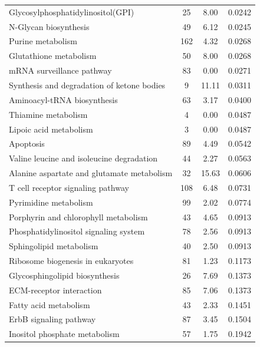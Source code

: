 \begin{table}[htbp]
\begin{tabular}{lccc}
    Glycosylphosphatidylinositol(GPI) & 25    & 8.00  & 0.0242 \\
    N-Glycan biosynthesis & 49    & 6.12  & 0.0245 \\
    Purine metabolism & 162   & 4.32  & 0.0268 \\
    Glutathione metabolism & 50    & 8.00  & 0.0268 \\
    mRNA surveillance pathway & 83    & 0.00  & 0.0271 \\
    Synthesis and degradation of ketone bodies & 9     & 11.11 & 0.0311 \\
    Aminoacyl-tRNA biosynthesis & 63    & 3.17  & 0.0400 \\
    Thiamine metabolism & 4     & 0.00  & 0.0487 \\
    Lipoic acid metabolism & 3     & 0.00  & 0.0487 \\
    \midrule
    Apoptosis & 89    & 4.49  & 0.0542 \\
    Valine  leucine and isoleucine degradation & 44    & 2.27  & 0.0563 \\
    Alanine  aspartate and glutamate metabolism & 32    & 15.63 & 0.0606 \\
    T cell receptor signaling pathway & 108   & 6.48  & 0.0731 \\
     Pyrimidine metabolism & 99    & 2.02  & 0.0774 \\
     Porphyrin and chlorophyll metabolism & 43    & 4.65  & 0.0913 \\
    Phosphatidylinositol signaling system & 78    & 2.56  & 0.0913 \\
     Sphingolipid metabolism & 40    & 2.50  & 0.0913 \\
     Ribosome biogenesis in eukaryotes & 81    & 1.23  & 0.1173 \\
     Glycosphingolipid biosynthesis & 26    & 7.69  & 0.1373 \\
     ECM-receptor interaction & 85    & 7.06  & 0.1373 \\
    Fatty acid metabolism & 43    & 2.33  & 0.1451 \\
     ErbB signaling pathway & 87    & 3.45  & 0.1504 \\
     Inositol phosphate metabolism & 57    & 1.75  & 0.1942 \\
    \hline\hline
\end{tabular}%
  \label{table:table4}%
\end{table}%

